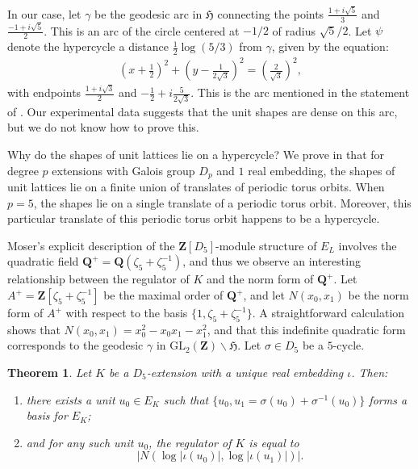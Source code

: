 \documentclass{amsart}
\newcommand{\QQ}{\mathbf{Q}}
\newcommand{\ZZ}{\mathbf{Z}}
\newcommand{\mf}[1]{\mathfrak{#1}}
\newcommand{\gl}{\mathrm{GL}}
\renewcommand{\H}{\mf{H}}
\newtheorem{theorem}{Theorem}[section]
\numberwithin{equation}{section}
\begin{document}
In our case, let $\gamma$ be the geodesic arc in $\H$ connecting the points $\frac{1+i\sqrt{5}}{3}$ and $\frac{-1+i\sqrt{5}}{2}$. This is an arc of the circle centered at $-1/2$ of radius $\sqrt{5}/2$. Let $\psi$ denote the hypercycle a distance $\frac{1}{2}\log(5/3)$ from $\gamma$, given by the equation:
\begin{align*}
	\left(x+\frac{1}{2}\right)^2+\left(y-\frac{1}{2\sqrt{3}}\right)^2=\left(\frac{2}{\sqrt{3}}\right)^2, 
\end{align*}
with endpoints $\frac{1+i\sqrt{3}}{2}$ and $-\frac{1}{2} + i \frac{5}{2\sqrt{3}}$. 
This is the arc mentioned in the statement of . Our experimental data suggests that the unit shapes are dense on this arc, but we do not know how to prove this. 

Why do the shapes of unit lattices lie on a hypercycle? We prove in  that for degree $p$ extensions with Galois group $D_p$ and $1$ real embedding, the shapes of unit lattices lie on a finite union of translates of periodic torus orbits. When $p = 5$, the shapes lie on a single translate of a periodic torus orbit. Moreover, this particular translate of this periodic torus orbit happens to be a hypercycle. 



Moser's explicit description of the $\ZZ[D_5]$-module structure of $E_L$ involves the quadratic field $\QQ^+ = \QQ(\zeta_5 + \zeta_5^{-1})$, and thus we observe an interesting relationship between the regulator of $K$ and the norm form of $\QQ^+$. Let $A^+ = \ZZ[\zeta_5 + \zeta_5^{-1}]$ be the maximal order of $\QQ^+$, and let $N(x_0, x_1)$ be the norm form of $A^{+}$ with respect to the basis $\{1, \zeta_5+\zeta_5^{-1}\}$. A straightforward calculation shows that $N(x_0, x_1)= x_0^2 - x_0x_1 - x_1^2$, and that this indefinite quadratic form corresponds to the geodesic $\gamma$ in $\gl_2(\ZZ)\backslash \mf{H}$. Let $\sigma \in D_5$ be a $5$-cycle.

\begin{theorem}\label{5regulator}
Let $K$ be a $D_5$-extension with a unique real embedding $\iota$. Then:
\begin{enumerate}
    \item there exists a unit $u_0 \in E_K$ such that $\{u_0, u_1 = \sigma(u_0) + \sigma^{-1}(u_0)\}$ forms a basis for $E_K$; 
    \item and for any such unit $u_0$, the regulator of $K$ is equal to
	\[
        \lvert N(\log \lvert \iota(u_0) \rvert, \log \lvert \iota(u_1) \rvert) \rvert.	
    \]
\end{enumerate}
\end{theorem}
\end{document}
